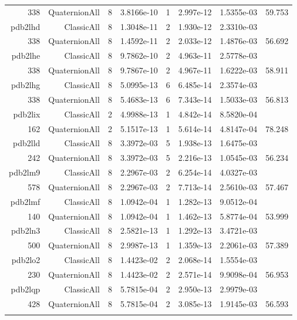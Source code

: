 \begin{xltabular}{\textwidth}{r|rcS[table-format=1.4e+2]cS[table-format=1.3e+2]S[table-format=1.4e+2]S[table-format=-1.3]}
338 & QuaternionAll & 8 & 3.8166e-10 & 1 & 2.997e-12 & 1.5355e-03 & 59.753\\  \addlinespace
pdb2lhd & ClassicAll & 8 & 1.3048e-11 & 2 & 1.930e-12 & 2.3310e-03 & \\
338 & QuaternionAll & 8 & 1.4592e-11 & 2 & 2.033e-12 & 1.4876e-03 & 56.692\\  \addlinespace
pdb2lhe & ClassicAll & 8 & 9.7862e-10 & 2 & 4.963e-11 & 2.5778e-03 & \\
338 & QuaternionAll & 8 & 9.7867e-10 & 2 & 4.967e-11 & 1.6222e-03 & 58.911\\  \addlinespace
pdb2lhg & ClassicAll & 8 & 5.0995e-13 & 6 & 6.485e-14 & 2.3574e-03 & \\
338 & QuaternionAll & 8 & 5.4683e-13 & 6 & 7.343e-14 & 1.5033e-03 & 56.813\\  \addlinespace
pdb2lix & ClassicAll & 2 & 4.9988e-13 & 1 & 4.842e-14 & 8.5820e-04 & \\
162 & QuaternionAll & 2 & 5.1517e-13 & 1 & 5.614e-14 & 4.8147e-04 & 78.248\\  \addlinespace
pdb2lld & ClassicAll & 8 & 3.3972e-03 & 5 & 1.938e-13 & 1.6475e-03 & \\
242 & QuaternionAll & 8 & 3.3972e-03 & 5 & 2.216e-13 & 1.0545e-03 & 56.234\\  \addlinespace
pdb2lm9 & ClassicAll & 8 & 2.2967e-03 & 2 & 6.254e-14 & 4.0327e-03 & \\
578 & QuaternionAll & 8 & 2.2967e-03 & 2 & 7.713e-14 & 2.5610e-03 & 57.467\\  \addlinespace
pdb2lmf & ClassicAll & 8 & 1.0942e-04 & 1 & 1.282e-13 & 9.0512e-04 & \\
140 & QuaternionAll & 8 & 1.0942e-04 & 1 & 1.462e-13 & 5.8774e-04 & 53.999\\  \addlinespace
pdb2ln3 & ClassicAll & 8 & 2.5821e-13 & 1 & 1.292e-13 & 3.4721e-03 & \\
500 & QuaternionAll & 8 & 2.9987e-13 & 1 & 1.359e-13 & 2.2061e-03 & 57.389\\  \addlinespace
pdb2lo2 & ClassicAll & 8 & 1.4423e-02 & 2 & 2.068e-14 & 1.5554e-03 & \\
230 & QuaternionAll & 8 & 1.4423e-02 & 2 & 2.571e-14 & 9.9098e-04 & 56.953\\  \addlinespace
pdb2lqp & ClassicAll & 8 & 5.7815e-04 & 2 & 2.950e-13 & 2.9979e-03 & \\
428 & QuaternionAll & 8 & 5.7815e-04 & 2 & 3.085e-13 & 1.9145e-03 & 56.593\\  \addlinespace

\end{xltabular}
